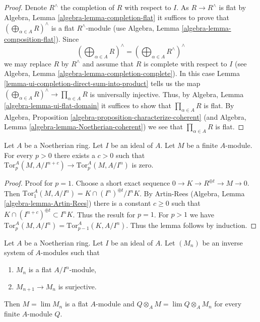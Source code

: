\begin{proof}
Denote $R^\wedge$ the completion of $R$ with respect to $I$. As
$R \to R^\wedge$ is flat by
Algebra, Lemma \ref{algebra-lemma-completion-flat}
it suffices to prove that
$(\bigoplus\nolimits_{\alpha \in A} R)^\wedge$ is a flat
$R^\wedge$-module (use
Algebra, Lemma \ref{algebra-lemma-composition-flat}).
Since
$$
(\bigoplus\nolimits_{\alpha \in A} R)^\wedge
=
(\bigoplus\nolimits_{\alpha \in A} R^\wedge)^\wedge
$$
we may replace $R$ by $R^\wedge$ and assume that $R$ is complete with
respect to $I$ (see
Algebra, Lemma \ref{algebra-lemma-completion-complete}).
In this case
Lemma \ref{lemma-ui-completion-direct-sum-into-product}
tells us the map
$(\bigoplus\nolimits_{\alpha \in A} R)^\wedge \to \prod_{\alpha \in A} R$
is universally injective. Thus, by
Algebra, Lemma \ref{algebra-lemma-ui-flat-domain}
it suffices to show that $\prod_{\alpha \in A} R$ is flat. By
Algebra, Proposition \ref{algebra-proposition-characterize-coherent}
(and
Algebra, Lemma \ref{algebra-lemma-Noetherian-coherent})
we see that $\prod_{\alpha \in A} R$ is flat.
\end{proof}

\begin{lemma}
\label{lemma-tor-strictly-pro-zero}
Let $A$ be a Noetherian ring. Let $I$ be an ideal of $A$.
Let $M$ be a finite $A$-module. For every $p > 0$ there exists a $c > 0$
such that $\text{Tor}_p^A(M, A/I^{n + c}) \to \text{Tor}_p^A(M, A/I^n)$
is zero.
\end{lemma}

\begin{proof}
Proof for $p = 1$. Choose a short exact sequence
$0 \to K \to R^{\oplus t} \to M \to 0$. Then
$\text{Tor}_1^A(M, A/I^n) = K \cap (I^n)^{\oplus t}/I^nK$.
By Artin-Rees (Algebra, Lemma \ref{algebra-lemma-Artin-Rees})
there is a constant $c \geq 0$ such that
$K \cap (I^{n + c})^{\oplus t} \subset I^nK$. Thus the result
for $p = 1$. For $p > 1$ we have
$\text{Tor}_p^A(M, A/I^n) = \text{Tor}^A_{p - 1}(K, A/I^n)$.
Thus the lemma follows by induction.
\end{proof}

\begin{lemma}
\label{lemma-limit-flat}
Let $A$ be a Noetherian ring. Let $I$ be an ideal of $A$. Let
$(M_n)$ be an inverse system of $A$-modules such that
\begin{enumerate}
\item $M_n$ is a flat $A/I^n$-module,
\item $M_{n + 1} \to M_n$ is surjective.
\end{enumerate}
Then $M = \lim M_n$ is a flat $A$-module and
$Q \otimes_A M = \lim Q \otimes_A M_n$ for every finite $A$-module $Q$.
\end{lemma}

